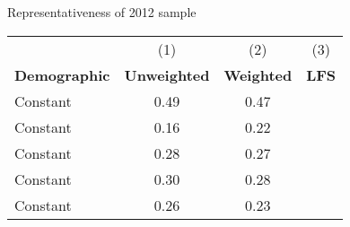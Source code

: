 \begin{center}
\begin{threeparttable}[!h]
\caption{Representativeness of 2012 sample}
\begin{tabular}{lccc}
\toprule
\toprule
&\multicolumn{1}{c}{(1)}&\multicolumn{1}{c}{(2)}&\multicolumn{1}{c}{(3)} \\
\textbf{Demographic}&\multicolumn{1}{c}{\textbf{Unweighted}}&\multicolumn{1}{c}{\textbf{Weighted}}&\multicolumn{1}{c}{\textbf{LFS}} \\
\midrule
Constant            &        0.49&        0.47\\
Constant            &        0.16&        0.22\\
Constant            &        0.28&        0.27\\
Constant            &        0.30&        0.28\\
Constant            &        0.26&        0.23\\
\bottomrule
\bottomrule
\end{tabular}
\end{threeparttable}
\end{center}
